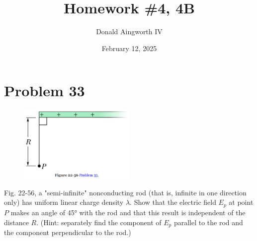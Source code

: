 \documentclass[12pt]{article}
\title{Homework \#4, 4B}
\author{Donald Aingworth IV}
\date{February 12, 2025}
\begin{document}

\maketitle


\section{Problem 33}
\begin{figure}
    \vspace{-30pt}
    \includegraphics[width=0.5\textwidth]{picture_1.png} 
\end{figure}
Fig. 22-56, a "semi-infinite" nonconducting rod (that is, infinite in one direction only) has uniform linear charge density $\lambda$. Show that the electric field $E_p$ at point $P$ makes an angle of 45\unit{\degree} with the rod and that this result is independent of the distance $R$. (Hint: separately find the component of $E_p$ parallel to the rod and the component perpendicular to the rod.)
\end{document}
